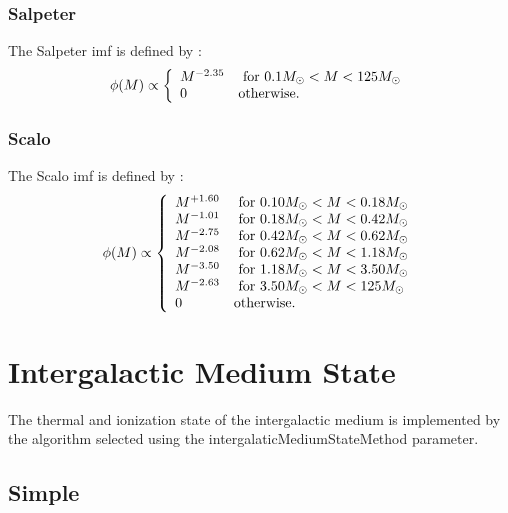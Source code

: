 \subsubsection{Salpeter}

The {\normalfont \ttfamily Salpeter} \gls{imf} is defined by \citep{salpeter_luminosity_1955}:
\begin{equation}
 \phi(M) \propto \left\{ \begin{array}{ll} M^{-2.35} & \hbox{ for } 0.1M_\odot < M < 125M_\odot \\ 0 & \hbox {otherwise.} \end{array} \right.
\end{equation}

\subsubsection{Scalo}

The {\normalfont \ttfamily Scalo} \gls{imf} is defined by \citep{scalo_stellar_1986}:
\begin{equation}
 \phi(M) \propto \left\{ \begin{array}{ll}
 M^{+1.60} & \hbox{ for } 0.10M_\odot < M < 0.18M_\odot \\
 M^{-1.01} & \hbox{ for } 0.18M_\odot < M < 0.42M_\odot \\
 M^{-2.75} & \hbox{ for } 0.42M_\odot < M < 0.62M_\odot \\
 M^{-2.08} & \hbox{ for } 0.62M_\odot < M < 1.18M_\odot \\
 M^{-3.50} & \hbox{ for } 1.18M_\odot < M < 3.50M_\odot \\
 M^{-2.63} & \hbox{ for } 3.50M_\odot < M < 125M_\odot \\
 0 & \hbox {otherwise.} \end{array} \right.
\end{equation}

\section{Intergalactic Medium State}\label{sec:IntergalacticMediumStateMethod}

The thermal and ionization state of the intergalactic medium is implemented by the algorithm selected using the {\normalfont \ttfamily intergalaticMediumStateMethod} parameter.

\subsection{Simple}\label{phys:intergalacticMediumState:intergalacticMediumStateSimple}

